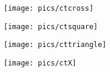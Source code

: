 \documentclass[a4paper,10pt]{article}
\begin{document}
\phantom{a}
\begin{center}
\vspace{4cm}
\texttt{[image: pics/ctcross]}
\end{center}

\newpage
\thispagestyle{empty}
\phantom{a}
\begin{center}
\vspace{4cm}
\texttt{[image: pics/ctsquare]}
\end{center}

\newpage
\thispagestyle{empty}

\phantom{a}
\begin{center}
\vspace{4cm}
\texttt{[image: pics/cttriangle]}
\end{center}

\newpage
\thispagestyle{empty}

\phantom{a}
\begin{center}
\vspace{4cm}
\texttt{[image: pics/ctX]}
\end{center}


% 
% 
% 
\end{document}
